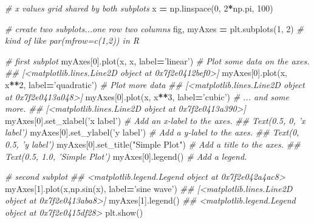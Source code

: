 \documentclass[12pt,krantz2]{krantz}
\makeatletter
\newenvironment{Shaded}{\begin{snugshade}}{\end{snugshade}}
\newcommand{\CommentTok}[1]{\textcolor[rgb]{0.37,0.37,0.37}{\textit{#1}}}
\newcommand{\DecValTok}[1]{\textcolor[rgb]{0.06,0.06,0.06}{#1}}
\newcommand{\NormalTok}[1]{#1}
\newcommand{\OperatorTok}[1]{\textcolor[rgb]{0.43,0.43,0.43}{\textbf{#1}}}
\newcommand{\StringTok}[1]{\textcolor[rgb]{0.5,0.5,0.5}{#1}}
\newenvironment{kframe}{%
\medskip{}
\setlength{\fboxsep}{.8em}
 \def\at@end@of@kframe{}%
 \ifinner\ifhmode%
  \def\at@end@of@kframe{\end{minipage}}%
  \begin{minipage}{\columnwidth}%
 \fi\fi%
 \def\FrameCommand##1{\hskip\@totalleftmargin \hskip-\fboxsep
 \colorbox{shadecolor}{##1}\hskip-\fboxsep
     \hskip-\linewidth \hskip-\@totalleftmargin \hskip\columnwidth}%
 \MakeFramed {\advance\hsize-\width
   \@totalleftmargin\z@ \linewidth\hsize
   \@setminipage}}%
 {\par\unskip\endMakeFramed%
 \at@end@of@kframe}
\renewenvironment{Shaded}{\begin{kframe}}{\end{kframe}}
\makeatother
\begin{document}
\begin{Shaded}
\begin{Highlighting}[]
\CommentTok{# x values grid shared by both subplots}
\NormalTok{x }\OperatorTok{=}\NormalTok{ np.linspace(}\DecValTok{0}\NormalTok{, }\DecValTok{2}\OperatorTok{*}\NormalTok{np.pi, }\DecValTok{100}\NormalTok{) }

\CommentTok{# create two subplots...one row two columns}
\NormalTok{fig, myAxes }\OperatorTok{=}\NormalTok{ plt.subplots(}\DecValTok{1}\NormalTok{, }\DecValTok{2}\NormalTok{) }\CommentTok{# kind of like par(mfrow=c(1,2)) in R}

\CommentTok{# first subplot}
\NormalTok{myAxes[}\DecValTok{0}\NormalTok{].plot(x, x, label}\OperatorTok{=}\StringTok{'linear'}\NormalTok{)  }\CommentTok{# Plot some data on the axes.}
\CommentTok{## [<matplotlib.lines.Line2D object at 0x7f2e0412bef0>]}
\NormalTok{myAxes[}\DecValTok{0}\NormalTok{].plot(x, x}\OperatorTok{**}\DecValTok{2}\NormalTok{, label}\OperatorTok{=}\StringTok{'quadratic'}\NormalTok{)  }\CommentTok{# Plot more data }
\CommentTok{## [<matplotlib.lines.Line2D object at 0x7f2e0413a048>]}
\NormalTok{myAxes[}\DecValTok{0}\NormalTok{].plot(x, x}\OperatorTok{**}\DecValTok{3}\NormalTok{, label}\OperatorTok{=}\StringTok{'cubic'}\NormalTok{)  }\CommentTok{# ... and some more.}
\CommentTok{## [<matplotlib.lines.Line2D object at 0x7f2e0413a390>]}
\NormalTok{myAxes[}\DecValTok{0}\NormalTok{].set_xlabel(}\StringTok{'x label'}\NormalTok{)  }\CommentTok{# Add an x-label to the axes.}
\CommentTok{## Text(0.5, 0, 'x label')}
\NormalTok{myAxes[}\DecValTok{0}\NormalTok{].set_ylabel(}\StringTok{'y label'}\NormalTok{)  }\CommentTok{# Add a y-label to the axes.}
\CommentTok{## Text(0, 0.5, 'y label')}
\NormalTok{myAxes[}\DecValTok{0}\NormalTok{].set_title(}\StringTok{"Simple Plot"}\NormalTok{)  }\CommentTok{# Add a title to the axes.}
\CommentTok{## Text(0.5, 1.0, 'Simple Plot')}
\NormalTok{myAxes[}\DecValTok{0}\NormalTok{].legend()  }\CommentTok{# Add a legend.}

\CommentTok{# second subplot}
\CommentTok{## <matplotlib.legend.Legend object at 0x7f2e042a4ac8>}
\NormalTok{myAxes[}\DecValTok{1}\NormalTok{].plot(x,np.sin(x), label}\OperatorTok{=}\StringTok{'sine wave'}\NormalTok{)}
\CommentTok{## [<matplotlib.lines.Line2D object at 0x7f2e0413aba8>]}
\NormalTok{myAxes[}\DecValTok{1}\NormalTok{].legend()}
\CommentTok{## <matplotlib.legend.Legend object at 0x7f2e0415df28>}
\NormalTok{plt.show()}
\end{Highlighting}
\end{Shaded}
\end{document}
